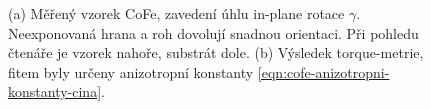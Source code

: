 \begin{figure}[htbp]
    \centering
    
    \caption{(a) Měřený vzorek CoFe, zavedení úhlu in-plane rotace $\gamma$. Neexponovaná hrana a roh dovolují snadnou orientaci. Při pohledu čtenáře je vzorek nahoře, substrát dole. (b) Výsledek torque-metrie, fitem byly určeny anizotropní konstanty \eqref{eqn:cofe-anizotropni-konstanty-cina}\cite{zengIntrinsicMechanismAnisotropic2020}.}
    \label{fig:vzorek-cofe}
\end{figure}
